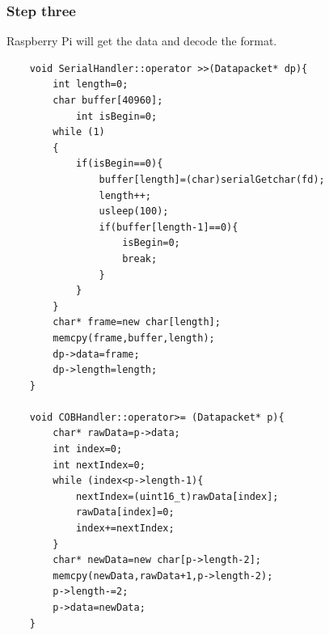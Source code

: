 \documentclass{article}
\begin{document}
	\subsubsection{Step three}
	Raspberry Pi will get the data and decode the format.
	\begin{lstlisting}
	void SerialHandler::operator >>(Datapacket* dp){
		int length=0;
		char buffer[40960];
			int isBegin=0;
		while (1)
		{
			if(isBegin==0){
				buffer[length]=(char)serialGetchar(fd);
				length++;
				usleep(100);
				if(buffer[length-1]==0){
					isBegin=0;
					break;
				}
			}
		}
		char* frame=new char[length];
		memcpy(frame,buffer,length);
		dp->data=frame;
		dp->length=length;
	}
	
	void COBHandler::operator>= (Datapacket* p){
		char* rawData=p->data;
		int index=0;
		int nextIndex=0;
		while (index<p->length-1){
			nextIndex=(uint16_t)rawData[index];
			rawData[index]=0;
			index+=nextIndex;
		}
		char* newData=new char[p->length-2];
		memcpy(newData,rawData+1,p->length-2);
		p->length-=2;
		p->data=newData;
	} 
	\end{lstlisting}
\end{document}
